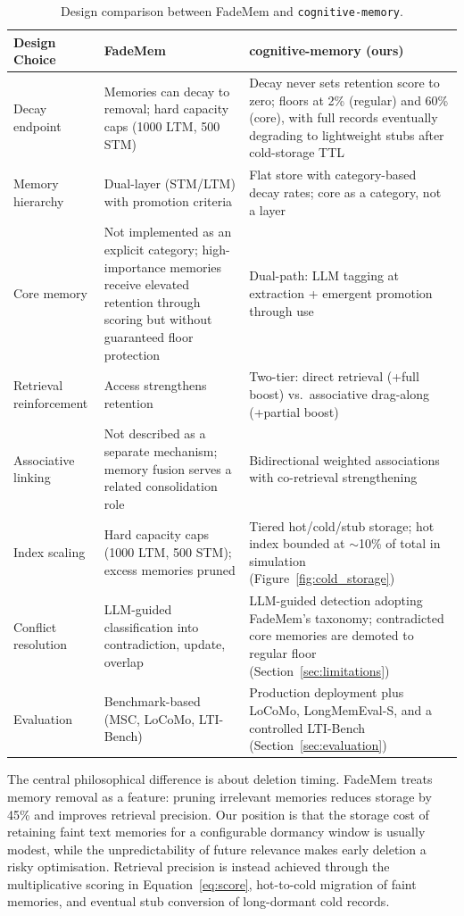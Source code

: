 \documentclass[11pt,a4paper]{article}
\begin{document}
\begin{table}[htbp]
\centering
\small
\begin{tabular}{@{}L{3cm}L{5.5cm}L{5.5cm}@{}}
\toprule
\textbf{Design Choice} & \textbf{FadeMem} & \textbf{cognitive-memory (ours)} \\
\midrule
Decay endpoint & Memories can decay to removal; hard capacity caps (1000 LTM, 500 STM) & Decay never sets retention score to zero; floors at 2\% (regular) and 60\% (core), with full records eventually degrading to lightweight stubs after cold-storage TTL \\
\addlinespace
Memory hierarchy & Dual-layer (STM/LTM) with promotion criteria & Flat store with category-based decay rates; core as a category, not a layer \\
\addlinespace
Core memory & Not implemented as an explicit category; high-importance memories receive elevated retention through scoring but without guaranteed floor protection & Dual-path: LLM tagging at extraction + emergent promotion through use \\
\addlinespace
Retrieval reinforcement & Access strengthens retention & Two-tier: direct retrieval (+full boost) vs.\ associative drag-along (+partial boost) \\
\addlinespace
Associative linking & Not described as a separate mechanism; memory fusion serves a related consolidation role & Bidirectional weighted associations with co-retrieval strengthening \\
\addlinespace
Index scaling & Hard capacity caps (1000 LTM, 500 STM); excess memories pruned & Tiered hot/cold/stub storage; hot index bounded at $\sim$10\% of total in simulation (Figure~\ref{fig:cold_storage}) \\
\addlinespace
Conflict resolution & LLM-guided classification into contradiction, update, overlap & LLM-guided detection adopting FadeMem's taxonomy; contradicted core memories are demoted to regular floor (Section~\ref{sec:limitations}) \\
\addlinespace
Evaluation & Benchmark-based (MSC, LoCoMo, LTI-Bench) & Production deployment plus LoCoMo, LongMemEval-S, and a controlled LTI-Bench (Section~\ref{sec:evaluation}) \\
\bottomrule
\end{tabular}
\caption{Design comparison between FadeMem and \texttt{cognitive-memory}.}
\label{tab:comparison}
\end{table}

The central philosophical difference is about deletion timing. FadeMem treats memory removal as a feature: pruning irrelevant memories reduces storage by 45\% and improves retrieval precision. Our position is that the storage cost of retaining faint text memories for a configurable dormancy window is usually modest, while the unpredictability of future relevance makes early deletion a risky optimisation. Retrieval precision is instead achieved through the multiplicative scoring in Equation~\ref{eq:score}, hot-to-cold migration of faint memories, and eventual stub conversion of long-dormant cold records.
\end{document}
